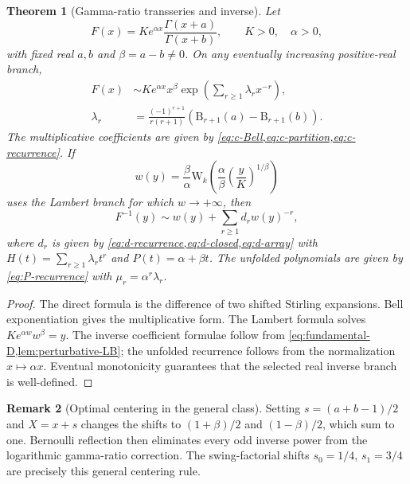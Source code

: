 \documentclass[11pt,a4paper]{article}
\theoremstyle{clean}
\newtheorem{theorem}{Theorem}[section]
\theoremstyle{definition}
\newtheorem{remark}[theorem]{Remark}
\newcommand{\al}{\alpha}
\newcommand{\be}{\beta}
\newcommand{\B}{\mathrm B}
\newcommand{\W}{\mathrm W}
\begin{document}
\begin{theorem}[Gamma-ratio transseries and inverse]
\label{thm:general-gamma-ratio}
Let
\begin{equation}
 F(x)=K e^{\al x}\frac{\Gamma(x+a)}{\Gamma(x+b)},
 \qquad K>0,\quad \al>0,
 \label{eq:general-F}
\end{equation}
with fixed real \(a,b\) and \(\be=a-b\ne0\).  On any eventually increasing positive-real branch,
\begin{align}
 F(x)&\sim K e^{\al x}x^\be
 \exp\!\left(\sum_{r\ge1}\lambda_r x^{-r}\right),
 \label{eq:general-F-direct}\\
 \lambda_r&=\frac{(-1)^{r+1}}{r(r+1)}
 \left(\B_{r+1}(a)-\B_{r+1}(b)\right).
 \label{eq:general-F-lambda}
\end{align}
The multiplicative coefficients are given by \cref{eq:c-Bell,eq:c-partition,eq:c-recurrence}.  If
\begin{equation}
 w(y)=\frac\be\al\W_k\!\left(
 \frac\al\be\left(\frac yK\right)^{1/\be}
 \right)
 \label{eq:general-F-w}
\end{equation}
uses the Lambert branch for which \(w\to+\infty\), then
\begin{equation}
 F^{-1}(y)\sim w(y)+\sum_{r\ge1}d_rw(y)^{-r},
 \label{eq:general-F-inverse}
\end{equation}
where \(d_r\) is given by \cref{eq:d-recurrence,eq:d-closed,eq:d-array} with
\(
 H(t)=\sum_{r\ge1}\lambda_rt^r
\)
and \(P(t)=\al+\be t\).  The unfolded polynomials are given by \cref{eq:P-recurrence} with \(\mu_r=\al^r\lambda_r\).
\end{theorem}

\begin{proof}
The direct formula is the difference of two shifted Stirling expansions.  Bell exponentiation gives the multiplicative form.  The Lambert formula solves \(Ke^{\al w}w^\be=y\).  The inverse coefficient formulae follow from \cref{eq:fundamental-D,lem:perturbative-LB}; the unfolded recurrence follows from the normalization \(x\mapsto\al x\).  Eventual monotonicity guarantees that the selected real inverse branch is well-defined.
\end{proof}

\begin{remark}[Optimal centering in the general class]
Setting
\(
 s=(a+b-1)/2
\)
and \(X=x+s\) changes the shifts to \((1+\be)/2\) and \((1-\be)/2\), which sum to one.  Bernoulli reflection then eliminates every odd inverse power from the logarithmic gamma-ratio correction.  The swing-factorial shifts \(s_0=1/4\), \(s_1=3/4\) are precisely this general centering rule.
\end{remark}
\end{document}
